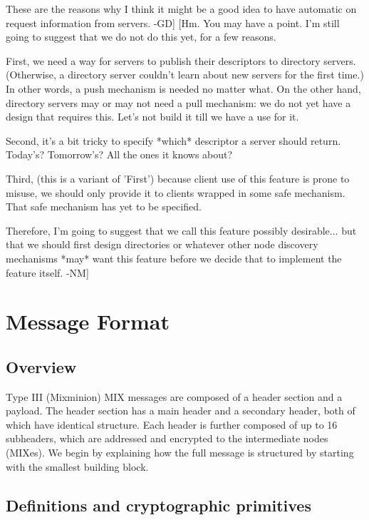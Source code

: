  These are the reasons why I think it might be a good idea to have automatic 
 on request information from servers. -GD]
[Hm.  You may have a point.  I'm still going to suggest that we do
 not do this yet, for a few reasons.

 First, we need a way for servers to publish their descriptors to
 directory servers.  (Otherwise, a directory server couldn't learn
 about new servers for the first time.)  In other words, a push
 mechanism is needed no matter what.  On the other hand, directory
 servers may or may not need a pull mechanism: we do not yet have a
 design that requires this.  Let's not build it till we have a use
 for it.

 Second, it's a bit tricky to specify *which* descriptor a server
 should return.  Today's?  Tomorrow's?  All the ones it knows about?

 Third, (this is a variant of 'First') because client use of this
 feature is prone to misuse, we should only provide it to clients
 wrapped in some safe mechanism.  That safe mechanism has yet to be
 specified.

 Therefore, I'm going to suggest that we call this feature possibly
 desirable... but that we should first design directories or whatever
 other node discovery mechanisms *may* want this feature before we
 decide that to implement the feature itself. -NM]

\section{Message Format}

\subsection{Overview}

Type III (Mixminion) MIX messages are composed of a header section and a
payload.  The header section has a main header and a
secondary header, both of which have identical structure.  Each
header is further composed of up to 16 subheaders, which are
addressed and encrypted to the intermediate nodes (MIXes).  We
begin by explaining how the full message is structured by starting
with the smallest building block.

\subsection{Definitions and cryptographic primitives}

